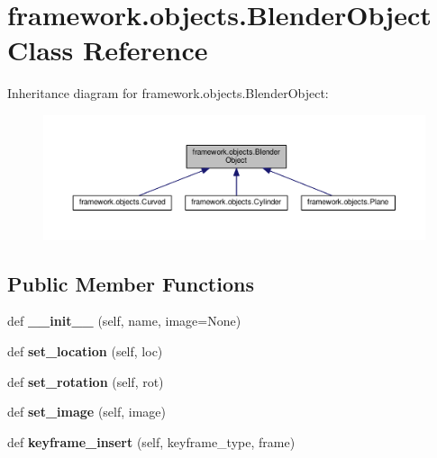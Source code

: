 \hypertarget{classframework_1_1objects_1_1BlenderObject}{}\section{framework.\+objects.\+Blender\+Object Class Reference}
\label{classframework_1_1objects_1_1BlenderObject}


Inheritance diagram for framework.\+objects.\+Blender\+Object\+:
\nopagebreak
\begin{figure}[H]
\begin{center}
\leavevmode
\includegraphics[width=350pt]{classframework_1_1objects_1_1BlenderObject__inherit__graph}
\end{center}
\end{figure}
\subsection*{Public Member Functions}
\begin{DoxyCompactItemize}
\item 
def {\bfseries \+\_\+\+\_\+init\+\_\+\+\_\+} (self, name, image=None)\hypertarget{classframework_1_1objects_1_1BlenderObject_a88d49788968741d6d37f20f38900b451}{}\label{classframework_1_1objects_1_1BlenderObject_a88d49788968741d6d37f20f38900b451}

\item 
def {\bfseries set\+\_\+location} (self, loc)\hypertarget{classframework_1_1objects_1_1BlenderObject_a3ea36025c4d18f76a18f937aacb38a66}{}\label{classframework_1_1objects_1_1BlenderObject_a3ea36025c4d18f76a18f937aacb38a66}

\item 
def {\bfseries set\+\_\+rotation} (self, rot)\hypertarget{classframework_1_1objects_1_1BlenderObject_ada16595efb0f086a7924b3f66de4c89b}{}\label{classframework_1_1objects_1_1BlenderObject_ada16595efb0f086a7924b3f66de4c89b}

\item 
def {\bfseries set\+\_\+image} (self, image)\hypertarget{classframework_1_1objects_1_1BlenderObject_aad4e39d8a1d94e9ce07884aa1db1c336}{}\label{classframework_1_1objects_1_1BlenderObject_aad4e39d8a1d94e9ce07884aa1db1c336}

\item 
def {\bfseries keyframe\+\_\+insert} (self, keyframe\+\_\+type, frame)\hypertarget{classframework_1_1objects_1_1BlenderObject_ac14208aa974016c67fdfa52bf296859e}{}\label{classframework_1_1objects_1_1BlenderObject_ac14208aa974016c67fdfa52bf296859e}

\end{DoxyCompactItemize}
